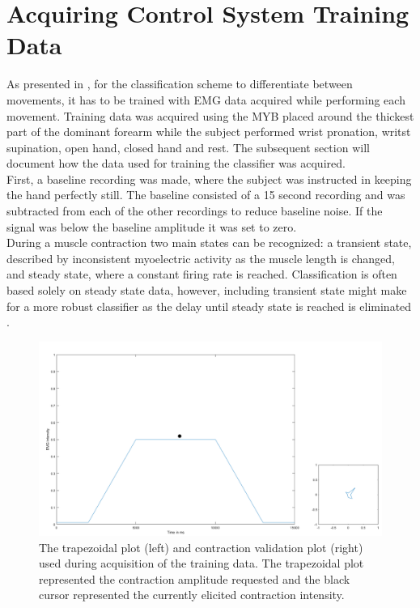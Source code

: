 
\section{Acquiring Control System Training Data}

As presented in , for the classification scheme to differentiate between movements, it has to be trained with EMG data acquired while performing each movement. Training data was acquired using the MYB placed around the thickest part of the dominant forearm while the subject performed wrist pronation, writst supination, open hand, closed hand and rest. The subsequent section will document how the data used for training the classifier was acquired. \\
First, a baseline recording was made, where the subject was instructed in keeping the hand perfectly still. The baseline consisted of a 15 second recording and was subtracted from each of the other recordings to reduce baseline noise. If the signal was below the baseline amplitude it was set to zero. \\
During a muscle contraction two main states can be recognized: a transient state, described by inconsistent myoelectric activity as the muscle length is changed, and steady state, where a constant firing rate is reached. \cite{Mobarak2014} Classification is often based solely on steady state data, however, including transient state might make for a more robust classifier as the delay until steady state is reached is eliminated \cite{Boschmann2013,Mobarak2014a}. \\
%

\begin{figure}[H]                 
	\includegraphics[width=1\textwidth]{figures/trapezoid}  
	\caption{The trapezoidal plot (left) and contraction validation plot (right) used during acquisition of the training data. The trapezoidal plot represented the contraction amplitude requested and the black cursor represented the currently elicited contraction intensity. }
	\label{fig:GUI} 
\end{figure}
\vspace{-1em}

